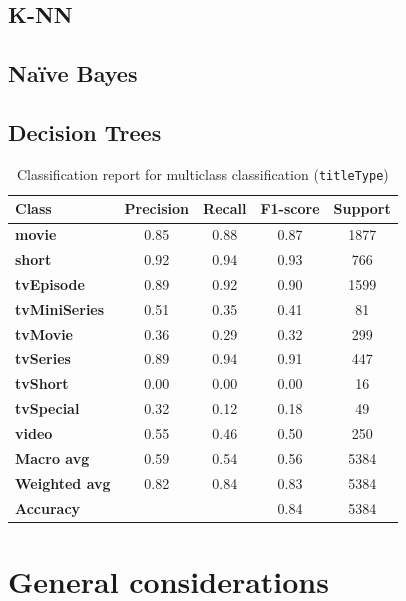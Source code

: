 \subsection*{K-NN}
\subsection*{Naïve Bayes}
\subsection*{Decision Trees}
\begin{table}[H]
    \centering
    \begin{tabular}{lcccc}
        \toprule
        \bf{Class} & \bf{Precision} & \bf{Recall} & \bf{F1-score} & \bf{Support} \\
        \midrule
        \bf{movie}         & 0.85 & 0.88 & 0.87 & 1877 \\
        \bf{short}         & 0.92 & 0.94 & 0.93 & 766 \\
        \bf{tvEpisode}     & 0.89 & 0.92 & 0.90 & 1599 \\
        \bf{tvMiniSeries}  & 0.51 & 0.35 & 0.41 & 81 \\
        \bf{tvMovie}       & 0.36 & 0.29 & 0.32 & 299 \\
        \bf{tvSeries}      & 0.89 & 0.94 & 0.91 & 447 \\
        \bf{tvShort}       & 0.00 & 0.00 & 0.00 & 16 \\
        \bf{tvSpecial}     & 0.32 & 0.12 & 0.18 & 49 \\
        \bf{video}         & 0.55 & 0.46 & 0.50 & 250 \\
        \midrule
        \bf{Macro avg}     & 0.59 & 0.54 & 0.56 & 5384 \\
        \bf{Weighted avg}  & 0.82 & 0.84 & 0.83 & 5384 \\
        \midrule
        \bf{Accuracy}      &      &      & 0.84 & 5384 \\
        \bottomrule
    \end{tabular}
    \caption{Classification report for multiclass classification (\texttt{titleType})}
    \label{tab:multiclass_classification_report}
\end{table}




\section{General considerations}\label{sec:general_considerations}
